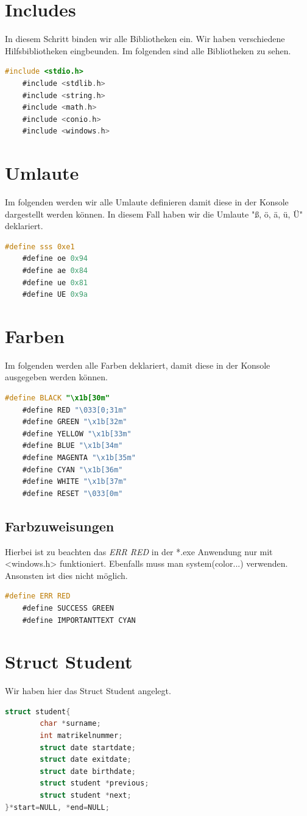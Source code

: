 \documentclass[a4paper, 11pt, oneside]{book} %
\begin{document}
\section{Includes}
In diesem Schritt binden wir alle Bibliotheken ein. Wir haben verschiedene Hilfsbibliotheken eingbeunden. Im folgenden sind alle Bibliotheken zu sehen.
\begin{lstlisting}[language=C]
	#include <stdio.h>
	#include <stdlib.h>
	#include <string.h> 
	#include <math.h>
	#include <conio.h>
	#include <windows.h>	
\end{lstlisting}
\section{Umlaute}
Im folgenden werden wir alle Umlaute definieren damit diese in der Konsole dargestellt werden können. In diesem Fall haben wir die Umlaute "ß, ö, ä, ü, Ü" deklariert.
\begin{lstlisting}[language=C]
	#define sss 0xe1 
	#define oe 0x94 
	#define ae 0x84 
	#define ue 0x81 
	#define UE 0x9a
\end{lstlisting}

\section{Farben}
Im folgenden werden alle Farben deklariert, damit diese in der Konsole ausgegeben werden können.
\begin{lstlisting}[language=C]
	#define BLACK "\x1b[30m"
	#define RED "\033[0;31m"
	#define GREEN "\x1b[32m"
	#define YELLOW "\x1b[33m"
	#define BLUE "\x1b[34m"
	#define MAGENTA "\x1b[35m"
	#define CYAN "\x1b[36m"
	#define WHITE "\x1b[37m"
	#define RESET "\033[0m"
\end{lstlisting}
\subsection{Farbzuweisungen}
Hierbei ist zu beachten das \textit{ERR RED} in der *.exe Anwendung nur mit <windows.h> funktioniert. Ebenfalls muss man system(color...) verwenden. Ansonsten ist dies nicht möglich.

\begin{lstlisting}[language=C]
	#define ERR RED
	#define SUCCESS GREEN
	#define IMPORTANTTEXT CYAN
\end{lstlisting}

\section{Struct Student}
 Wir haben hier das Struct Student angelegt.
\begin{lstlisting}[language=C]
	struct student{
    	char *surname;
    	int matrikelnummer;
    	struct date startdate;
    	struct date exitdate;
    	struct date birthdate;
    	struct student *previous;
    	struct student *next;
}*start=NULL, *end=NULL;
\end{lstlisting}
\end{document}
